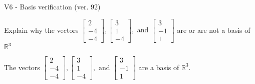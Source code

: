 \begin{exercise}
  \begin{exerciseTitle}V6 - Basis verification (ver. 92)\end{exerciseTitle}
  \begin{exerciseStatement}
    Explain why the vectors \(\left[\begin{array}{r}
2 \\
-4 \\
-4
\end{array}\right] , \left[\begin{array}{r}
3 \\
1 \\
-4
\end{array}\right] , \text{ and } \left[\begin{array}{r}
3 \\
-1 \\
1
\end{array}\right]\) are or are not a basis of \(\mathbb{R}^3\)	


  \end{exerciseStatement}
  \begin{exerciseAnswer}
   The vectors \(\left[\begin{array}{r}
2 \\
-4 \\
-4
\end{array}\right] , \left[\begin{array}{r}
3 \\
1 \\
-4
\end{array}\right] , \text{ and } \left[\begin{array}{r}
3 \\
-1 \\
1
\end{array}\right]\) 
  	 are  a basis of \(\mathbb{R}^3\).
  


  \end{exerciseAnswer}
\end{exercise}